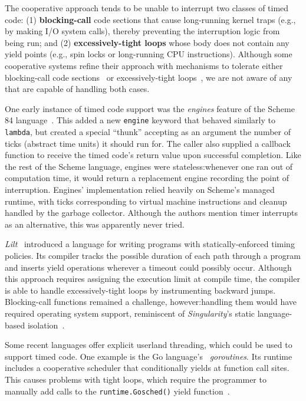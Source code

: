 The cooperative approach tends to be unable to interrupt two classes of timed code:\@
(1) \textbf{blocking-call} code sections that cause
long-running kernel traps (e.g., by making I/O system calls),
thereby preventing the interruption logic from being run; and (2)
\textbf{excessively-tight loops} whose body does not contain any yield points (e.g.,
spin locks or long-running CPU instructions).
Although some cooperative systems refine their approach with mechanisms
to tolerate either blocking-call code sections~\cite{www-golang} or excessively-tight
loops~\cite{vanderwaart:cmucs2006}, we are not aware of any that are capable of
handling both
cases.

One early instance of timed code support was the \textit{engines} feature of
the Scheme 84 language~\cite{haynes:iucs1984}.  This added a new \texttt{engine}
keyword that behaved similarly to \texttt{lambda}, but created a special ``thunk''
accepting as an argument the number of ticks (abstract time units) it should run for.
The caller also supplied a callback function to receive the
timed code's return value upon successful completion.  Like the rest of the
Scheme language, engines were stateless:\@ whenever one ran out of computation time,
it would return a replacement engine recording the point of interruption.  Engines'
implementation relied heavily on Scheme's managed runtime, with ticks
corresponding to virtual machine instructions and cleanup handled by the garbage
collector.  Although the authors mention timer interrupts as an
alternative, this was apparently never tried.

\textit{Lilt}~\cite{vanderwaart:cmucs2006} introduced a language for writing
programs with statically-enforced timing policies.
Its compiler tracks the possible duration of each path through a program and
inserts yield operations wherever a timeout could possibly occur.  Although this
approach requires assigning the execution limit at compile time, the compiler is able
to handle excessively-tight loops by instrumenting backward jumps.
Blocking-call functions remained a challenge, however:\@ handling them would have
required
operating system support, reminiscent of \textit{Singularity}'s static language-based
isolation~\cite{hunt:msr2005}.

Some recent languages offer explicit userland threading, which could be used to
support timed
code.  One example is the Go language's~\cite{www-golang} \textit{goroutines}.
Its runtime includes a cooperative scheduler that conditionally yields
at function call sites.  This causes problems with tight loops, which require the
programmer to manually add calls to the \texttt{runtime.Gosched()}
yield function~\cite{www-golang-tightloop}.

